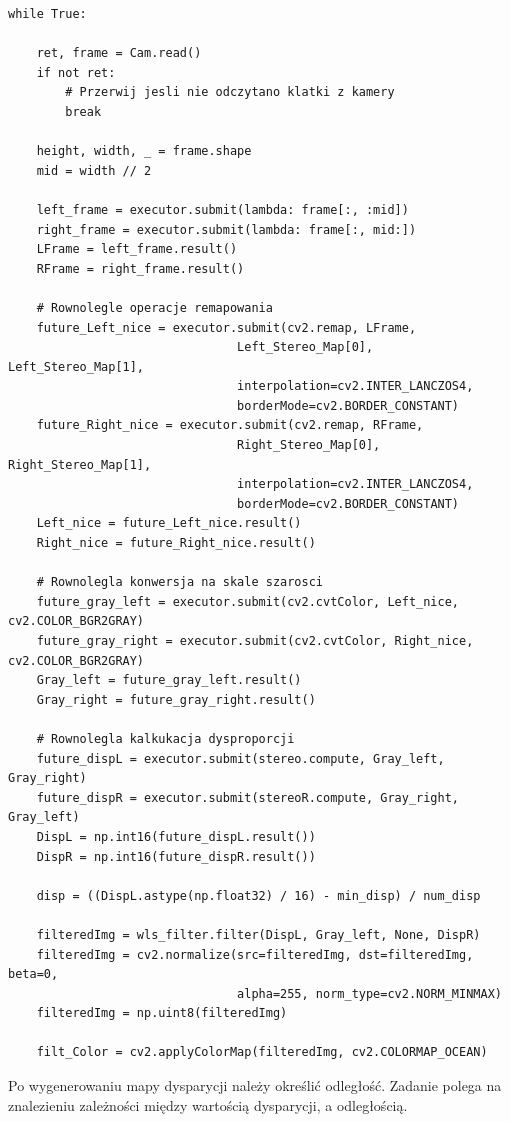 \documentclass[magisterska]{pracadypl}
\begin{document}
\begin{lstlisting}[style=mypython]
while True:

    ret, frame = Cam.read()
    if not ret:
        # Przerwij jesli nie odczytano klatki z kamery
        break

    height, width, _ = frame.shape
    mid = width // 2

    left_frame = executor.submit(lambda: frame[:, :mid])
    right_frame = executor.submit(lambda: frame[:, mid:])
    LFrame = left_frame.result()
    RFrame = right_frame.result()

    # Rownolegle operacje remapowania 
    future_Left_nice = executor.submit(cv2.remap, LFrame,
                                Left_Stereo_Map[0], Left_Stereo_Map[1],
                                interpolation=cv2.INTER_LANCZOS4,
                                borderMode=cv2.BORDER_CONSTANT)
    future_Right_nice = executor.submit(cv2.remap, RFrame,
                                Right_Stereo_Map[0], Right_Stereo_Map[1],
                                interpolation=cv2.INTER_LANCZOS4,
                                borderMode=cv2.BORDER_CONSTANT)
    Left_nice = future_Left_nice.result()
    Right_nice = future_Right_nice.result()

    # Rownolegla konwersja na skale szarosci
    future_gray_left = executor.submit(cv2.cvtColor, Left_nice, cv2.COLOR_BGR2GRAY)
    future_gray_right = executor.submit(cv2.cvtColor, Right_nice, cv2.COLOR_BGR2GRAY)
    Gray_left = future_gray_left.result()
    Gray_right = future_gray_right.result()

    # Rownolegla kalkukacja dysproporcji
    future_dispL = executor.submit(stereo.compute, Gray_left, Gray_right)
    future_dispR = executor.submit(stereoR.compute, Gray_right, Gray_left)
    DispL = np.int16(future_dispL.result())
    DispR = np.int16(future_dispR.result())

    disp = ((DispL.astype(np.float32) / 16) - min_disp) / num_disp

    filteredImg = wls_filter.filter(DispL, Gray_left, None, DispR)
    filteredImg = cv2.normalize(src=filteredImg, dst=filteredImg, beta=0, 
                                alpha=255, norm_type=cv2.NORM_MINMAX)
    filteredImg = np.uint8(filteredImg)

    filt_Color = cv2.applyColorMap(filteredImg, cv2.COLORMAP_OCEAN)
\end{lstlisting}

Po wygenerowaniu mapy dysparycji należy określić odległość. Zadanie polega na znalezieniu zależności między wartością dysparycji, a odległością.
\end{document}

